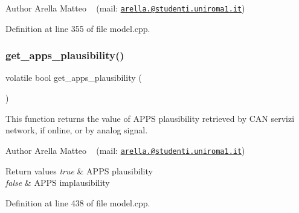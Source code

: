 \begin{DoxyAuthor}{Author}
Arella Matteo ~\newline
 (mail\+: \href{mailto:arella.1646983@studenti.uniroma1.it}{\tt arella.@studenti.\+uniroma1.\+it}) 
\end{DoxyAuthor}


Definition at line 355 of file model.\+cpp.

\mbox{\label{group___board__model__group_gae0acabf32ee7f2a82b2f9149ba3d1978}} 
\subsubsection{\texorpdfstring{get\+\_\+apps\+\_\+plausibility()}{get\_apps\_plausibility()}}
{\footnotesize\ttfamily volatile bool get\+\_\+apps\+\_\+plausibility (\begin{DoxyParamCaption}{ }\end{DoxyParamCaption})}



This function returns the value of A\+P\+PS plausibility retrieved by C\+AN servizi network, if online, or by analog signal. 

\begin{DoxyAuthor}{Author}
Arella Matteo ~\newline
 (mail\+: \href{mailto:arella.1646983@studenti.uniroma1.it}{\tt arella.@studenti.\+uniroma1.\+it})
\end{DoxyAuthor}

\begin{DoxyRetVals}{Return values}
{\em true} & A\+P\+PS plausibility \\
\hline
{\em false} & A\+P\+PS implausibility \\
\hline
\end{DoxyRetVals}


Definition at line 438 of file model.\+cpp.

\mbox{\label{group___board__model__group_ga6db41e7368919bc4dfafaf4e400ae1a9}} 
